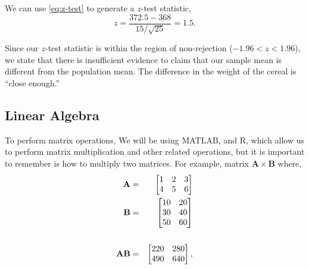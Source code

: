 We can use \eqref{eq:z-test} to generate a $z$-test statistic,
\[
z = \frac{372.5 - 368}{15/\sqrt{25}} = 1.5.
\]

Since our $z$-test statistic is within the region of non-rejection ($-1.96 < z < 1.96$), we state that there is insufficient evidence to claim that our sample mean is different from the population mean. The difference in the weight of the cereal is ``close enough.''

\subsection{Linear Algebra}
To perform matrix operations, We will be using MATLAB, and R, which allow us to perform matrix multiplication and other related operations, but it is important to remember is how to multiply two matrices.
For example, matrix $\mathbf{A} \times \mathbf{B}$ where,
\begin{eqnarray}
	\label{eq:matmult}
\mathbf{A} &=& \notag
	\begin{bmatrix}
	1 & 2 & 3 \\
	4 & 5 & 6 \\
	\end{bmatrix} \\
\mathbf{B}&=&  \notag
	\begin{bmatrix}
	10 & 20 \\
	30 & 40 \\
	50 & 60 \\
	\end{bmatrix} \\
\\ \notag
\mathbf{A} \mathbf{B}&=&
	\begin{bmatrix}
	220 & 280 \\
	490 & 640 \\
	\end{bmatrix},
\end{eqnarray}

